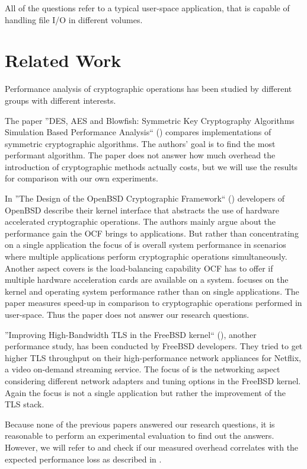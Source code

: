 All of the questions refer to a typical user-space application, that is capable of handling file I/O in different volumes.

\section{Related Work}\label{relatedwork}

Performance analysis of cryptographic operations has been studied by different groups with different interests.

The paper ''DES, AES and Blowfish: Symmetric Key Cryptography Algorithms Simulation Based Performance Analysis`` (\cite{thakur2011aes}) compares implementations of symmetric cryptographic algorithms.
The authors' goal is to find the most performant algorithm.
The paper does not answer how much overhead the introduction of cryptographic methods actually costs, but we will use the results for comparison with our own experiments.

In ''The Design of the OpenBSD Cryptographic Framework`` (\cite{ocf}) developers of OpenBSD describe their kernel interface that abstracts the use of hardware accelerated cryptographic operations.
The authors mainly argue about the performance gain the OCF brings to applications.
But rather than concentrating on a single application the focus of \cite{ocf} is overall system performance in scenarios where multiple applications perform cryptographic operations simultaneously.
Another aspect \cite{ocf} covers is the load-balancing capability OCF has to offer if multiple hardware acceleration cards are available on a system.
\cite{ocf} focuses on the kernel and operating system performance rather than on single applications.
The paper measures speed-up in comparison to cryptographic operations performed in user-space.
Thus the paper does not answer our research questions.

''Improving High-Bandwidth TLS in the FreeBSD kernel`` (\cite{freebsdtls}), another performance study, has been conducted by FreeBSD developers.
They tried to get higher TLS throughput on their high-performance network appliances for Netflix, a video on-demand streaming service.
The focus of \cite{freebsdtls} is the networking aspect considering different network adapters and tuning options in the FreeBSD kernel.
Again the focus is not a single application but rather the improvement of the TLS stack.

Because none of the previous papers answered our research questions, it is reasonable to perform an experimental evaluation to find out the answers.
However, we will refer to \cite{thakur2011aes} and check if our measured overhead correlates with the expected performance loss as described in \cite{thakur2011aes}.

